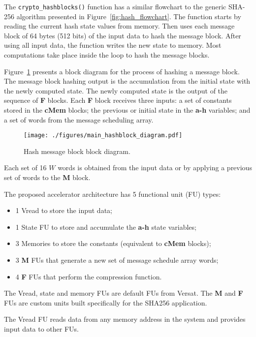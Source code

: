 The \texttt{crypto\_hashblocks()} function has a similar flowchart to the
generic SHA-256 algorithm presented in Figure~\ref{fig:hash_flowchart}. The
function starts by reading the current hash state values from memory. Then uses
each message block of 64 bytes (512 bits) of the input data to hash the message
block. After using all input data, the function writes the new state to memory.
Most computations take place inside the loop to hash the message blocks.

Figure~\ref{fig:main_hashblock_diagram} presents a block diagram for the
process of hashing a message block.
The message block hashing output is the accumulation from the initial state
with the newly computed state.
The newly computed state is the output of the sequence of \textbf{F} blocks. Each
\textbf{F} block receives three inputs: a set of constants stored in the
\textbf{cMem} blocks; the previous or initial state in the \textbf{a-h}
variables; and a set of words from the message scheduling array.

\begin{figure}[!htbp]
    \centerline{\texttt{[image: ./figures/main\_hashblock\_diagram.pdf]}}
    \vspace{0cm}\caption{Hash message block block diagram.}
    \label{fig:main_hashblock_diagram}
\end{figure}

Each set of 16 $W$ words is obtained from the input data or by applying
a previous set of words to the \textbf{M} block.

The proposed accelerator architecture has 5 functional unit (FU) types:
\begin{itemize}
    \item 1 Vread to store the input data;
    \item 1 State FU to store and accumulate the \textbf{a-h} state variables;
    \item 3 Memories to store the constants (equivalent to \textbf{cMem}
        blocks);
    \item 3 \textbf{M} FUs that generate a new set of message schedule array
        words;
    \item 4 \textbf{F} FUs that perform the compression function.
\end{itemize}

The Vread, state and memory FUs are default FUs from Versat. The \textbf{M} and
\textbf{F} FUs are custom units built specifically for the SHA256 application.

The Vread FU reads data from any memory address in the system and provides input
data to other FUs.

